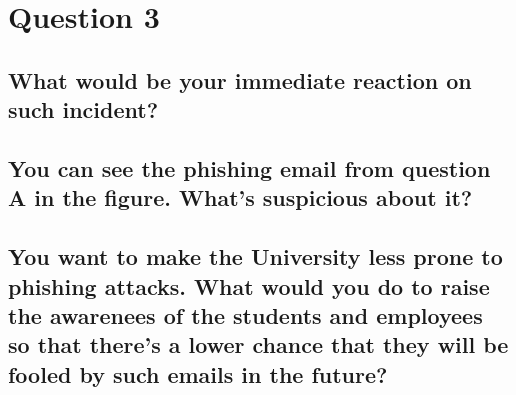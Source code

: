 \documentclass{report}
\begin{document}
	\section{Question 3}
	\startsection
		\renewcommand{\thesubsection}{\thesection.\Alph{subsection}}
		\subsection{What would be your immediate reaction on such incident?}
		\startsubsection
		\closesection
		\subsection{You can see the phishing email from question A in the figure. What's suspicious about it?}
		\startsubsection
		\closesection
		\subsection{You want to make the University less prone to phishing attacks. What would you do to raise the awarenees of the students and employees so that there's a lower chance that they will be fooled by such emails in the future?}
		\startsubsection
		\closesection
	\closesection
\end{document}
